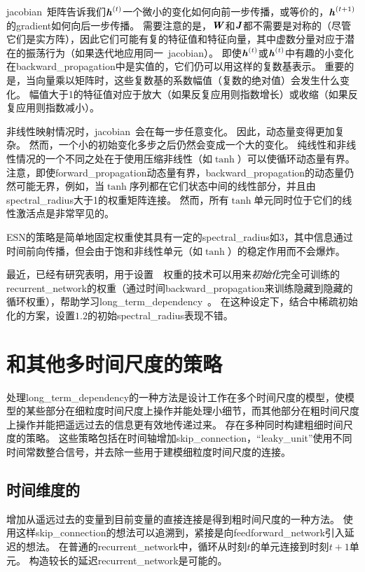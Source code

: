 \gls{jacobian}~矩阵告诉我们$\boldsymbol{\mathit{h}}^{(t)}$一个微小的变化如何向前一步传播，或等价的，$\boldsymbol{\mathit{h}}^{(t+1)}$的\gls{gradient}如何向后一步传播。
需要注意的是，$\boldsymbol{\mathit{W}}$和$\boldsymbol{\mathit{J}}$都不需要是对称的（尽管它们是实方阵），因此它们可能有复的特征值和特征向量，其中虚数分量对应于潜在的振荡行为（如果迭代地应用同一~\gls{jacobian}）。
即使$\boldsymbol{\mathit{h}}^{(t)}$或$\boldsymbol{\mathit{h}}^{(t)}$中有趣的小变化在\gls{backward_propagation}中是实值的，它们仍可以用这样的复数基表示。
重要的是，当向量乘以矩阵时，这些复数基的系数幅值（复数的绝对值）会发生什么变化。
幅值大于1的特征值对应于放大（如果反复应用则指数增长）或收缩（如果反复应用则指数减小）。

非线性映射情况时，\gls{jacobian}~会在每一步任意变化。
因此，动态量变得更加复杂。
然而，一个小的初始变化多步之后仍然会变成一个大的变化。
纯线性和非线性情况的一个不同之处在于使用压缩非线性（如$\tanh$）可以使循环动态量有界。
注意，即使\gls{forward_propagation}动态量有界，\gls{backward_propagation}的动态量仍然可能无界，例如，当$\tanh$序列都在它们状态中间的线性部分，并且由\gls{spectral_radius}大于1的权重矩阵连接。
然而，所有$\tanh$单元同时位于它们的线性激活点是非常罕见的。


\gls{ESN}的策略是简单地固定权重使其具有一定的\gls{spectral_radius}如3，其中信息通过时间前向传播，但会由于饱和非线性单元（如$\tanh$）的稳定作用而不会爆炸。

最近，已经有研究表明，用于设置~~权重的技术可以用来\emph{初始化}完全可训练的\gls{recurrent_network}的权重（通过时间\gls{backward_propagation}来训练隐藏到隐藏的循环权重），帮助学习\gls{long_term_dependency}~\citep{Sutskever-thesis2012,sutskeverimportance}。
在这种设定下，结合中稀疏初始化的方案，设置$1.2$的初始\gls{spectral_radius}表现不错。

\section{和其他多时间尺度的策略}
\label{sec:leaky_units_and_other_strategiesfor_multiple_time_scales}
处理\gls{long_term_dependency}的一种方法是设计工作在多个时间尺度的模型，使模型的某些部分在细粒度时间尺度上操作并能处理小细节，而其他部分在粗时间尺度上操作并能把遥远过去的信息更有效地传递过来。
存在多种同时构建粗细时间尺度的策略。
这些策略包括在时间轴增加\gls{skip_connection}，``\gls{leaky_unit}''使用不同时间常数整合信号，并去除一些用于建模细粒度时间尺度的连接。

\subsection{时间维度的}
\label{sec:adding_skip_connections_through_time}
增加从遥远过去的变量到目前变量的直接连接是得到粗时间尺度的一种方法。
使用这样\gls{skip_connection}的想法可以追溯到\cite{Lin-ieeetnn96}，紧接是向\gls{feedforward_network}引入延迟的想法\citep{Lang+Hinton88}。
在普通的\gls{recurrent_network}中，循环从时刻$t$的单元连接到时刻$t+1$单元。
构造较长的延迟\gls{recurrent_network}是可能的\citep{Bengio91}。

